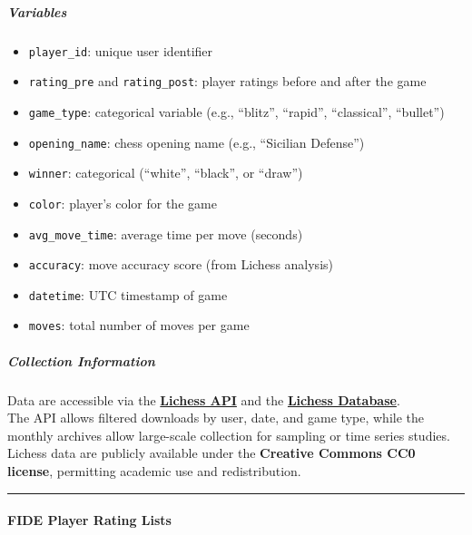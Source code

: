 \documentclass[
]{article}
\providecommand{\tightlist}{%
  \setlength{\itemsep}{0pt}\setlength{\parskip}{0pt}}
\begin{document}
\subparagraph{Variables}\label{variables}

\begin{itemize}
\tightlist
\item
  \texttt{player\_id}: unique user identifier\\
\item
  \texttt{rating\_pre} and \texttt{rating\_post}: player ratings before
  and after the game\\
\item
  \texttt{game\_type}: categorical variable (e.g., ``blitz'', ``rapid'',
  ``classical'', ``bullet'')\\
\item
  \texttt{opening\_name}: chess opening name (e.g., ``Sicilian
  Defense'')\\
\item
  \texttt{winner}: categorical (``white'', ``black'', or ``draw'')\\
\item
  \texttt{color}: player's color for the game\\
\item
  \texttt{avg\_move\_time}: average time per move (seconds)\\
\item
  \texttt{accuracy}: move accuracy score (from Lichess analysis)\\
\item
  \texttt{datetime}: UTC timestamp of game\\
\item
  \texttt{moves}: total number of moves per game
\end{itemize}

\subparagraph{Collection Information}\label{collection-information}

Data are accessible via the
\textbf{\href{https://lichess.org/api}{Lichess API}} and the
\textbf{\href{https://database.lichess.org/}{Lichess Database}}.\\
The API allows filtered downloads by user, date, and game type, while
the monthly archives allow large-scale collection for sampling or time
series studies.\\
Lichess data are publicly available under the \textbf{Creative Commons
CC0 license}, permitting academic use and redistribution.

\begin{center}\rule{0.5\linewidth}{0.5pt}\end{center}

\paragraph{FIDE Player Rating Lists}\label{fide-player-rating-lists}
\end{document}
